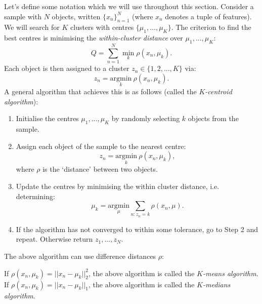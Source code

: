 Let's define some notation which we will use throughout this section. Consider a sample with $N$ objects, written $\{x_n\}_{n=1}^{N}$ (where $x_n$ denotes a tuple of features). We will search for $K$ clusters with centres $\{\mu_1,...,\mu_K\}$. The criterion to find the best centres is minimising the \textit{within-cluster distance} over $\mu_1,...,\mu_K$:
\begin{equation*}
Q = \sum_{n=1}^{N} \min_{k} \rho(x_n,\mu_k).
\end{equation*}
Each object is then assigned to a cluster $z_n \in \{1,2,...,K\}$ via:
\begin{equation*}
z_n = \underset{k}{\textrm{argmin}}\ \rho(x_n, \mu_k).
\end{equation*}
A general algorithm that achieves this is as follows (called the \textit{$K$-centroid algorithm}):
\begin{enumerate}[label = (\arabic*)]
\item Initialise the centres $\mu_1,...,\mu_K$ by randomly selecting $k$ objects from the sample.
\item Assign each object of the sample to the nearest centre:
\begin{equation*}
z_n = \underset{k}{\textrm{argmin}}\ \rho(x_n, \mu_k),
\end{equation*}
where $\rho$ is the `distance' between two objects.
\item Update the centres by minimising the within cluster distance, i.e. determining:
\begin{equation*}
\mu_k = \underset{\mu}{\textrm{argmin}} \sum_{n : z_n = k} \rho(x_n, \mu).
\end{equation*}
\item If the algorithm has not converged to within some tolerance, go to Step 2 and repeat. Otherwise return $z_1,...,z_N$. 
\end{enumerate}


\newpage
The above algorithm can use difference distances $\rho$:
\begin{framedef}
If $\rho(x_n, \mu_k) = ||x_n - \mu_k||_2^2$, the above algorithm is called the \textit{$K$-means algorithm}. If $\rho(x_n, \mu_k) = ||x_n - \mu_k||_1$, the above algorithm is called the \textit{$K$-medians algorithm}.
\end{framedef}

